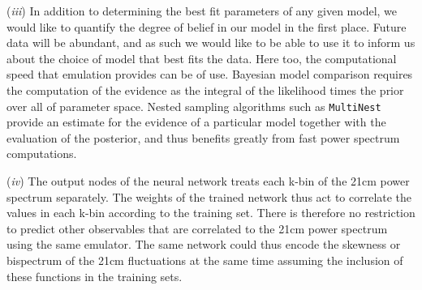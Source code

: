 \documentclass[useAMS,usenatbib]{mnras}
\begin{document}
(\textit{iii}) In addition to determining the best fit parameters of any given model, we would like to quantify the degree of belief in our model in the first place. 
Future data will be abundant, and as such we would like to be able to use it to inform us about the choice of model that best fits the data. 
Here too, the computational speed that emulation provides can be of use.
Bayesian model comparison requires the computation of the evidence as the integral of the likelihood times the prior over all of parameter space.
Nested sampling algorithms such as \texttt{MultiNest} \citep{Feroz2009} provide an estimate for the evidence of a particular model together with the evaluation of the posterior, and thus benefits greatly from fast power spectrum computations. 


(\textit{iv}) The output nodes of the neural network treats each k-bin of the 21cm power spectrum separately. 
The weights of the trained network thus act to correlate the values in each k-bin according to the training set.
There is therefore no restriction to predict other observables that are correlated to the 21cm power spectrum using the same emulator.
The same network could thus encode the skewness or bispectrum of the 21cm fluctuations at the same time assuming the inclusion of these functions in the training sets.
\end{document}
